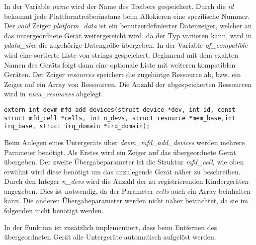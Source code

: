 In der Variable \textit{name} wird der Name des Treibers gespeichert. Durch die \textit{id} bekommt jede Plattformtreiberinstanz beim Allokieren eine spezifische Nummer.
Der \textit{void} Zeiger \textit{platform\_data} ist ein benutzerdefinierter Datenzeiger, welcher an das untergeordnete Gerät weitergereicht wird, da der Typ variieren kann, wird in \textit{pdata\_size} die zugehörige Datengröße übergeben. 
In der Variable \textit{of\_compatible} wird eine sortierte Liste von strings gespeichert. Beginnend mit dem exakten Namen des Geräts folgt dann eine optionale Liste mit weiteren kompatiblen Geräten. \cite[devicetree/usage\_model.txt, Zeile 116ff.]{linuxsourcedocu} %
Der Zeiger \textit{resources} speichert die zugehörige Ressource ab, bzw. ein Zeiger auf ein Array von Ressourcen. Die Anzahl der abgespeicherten Ressourcen wird in \textit{num\_resources} abgelegt.\\

\begin{lstfloat}
\begin{lstlisting}
extern int devm_mfd_add_devices(struct device *dev, int id, const struct mfd_cell *cells, int n_devs, struct resource *mem_base,int irq_base, struct irq_domain *irq_domain);
\end{lstlisting}
\end{lstfloat}

Beim Anlegen eines Untergeräts über \textit{devm\_mfd\_add\_devices} werden mehrere Parameter benötigt. 
Als Erstes wird ein Zeiger auf das übergeordnete Gerät übergeben. Der zweite Übergabeparameter ist die Struktur \textit{mfd\_cell}, wie oben erwähnt wird diese benötigt um das anzulegende Gerät näher zu beschreiben.
Durch den Integer \textit{n\_devs} wird die Anzahl der zu registrierenden Kindergeräten angegeben. Dies ist notwendig, da der Parameter \textit{cells} auch ein Array beinhalten kann. 
Die anderen Übergabeparameter werden nicht näher betrachtet, da sie im folgenden nicht benötigt werden. \cite[mfd/mfd-core.c, Zeile 359ff.]{linuxsourcedriver} %


In der Funktion ist zusätzlich implementiert, dass beim Entfernen des übergeordneten Gerät alle Untergeräte automatisch aufgelöst werden. \cite[mfd/mfd-core.c, Zeile 356f.]{linuxsourcedriver}%



